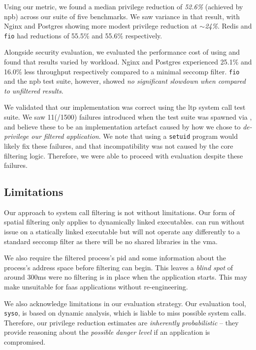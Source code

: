 Using our metric, we found a median privilege reduction of \textit{52.6\%}
(achieved by \ac{npb}) across our suite of five benchmarks. We saw variance in that
result, with Nginx and Postgres showing more modest privilege reduction at
$\sim$\textit{24\%}. Redis and \texttt{fio} had reductions of 55.5\% and 55.6\%
respectively.

Alongside security evaluation, we evaluated the performance cost of using \af
and found that results varied by workload. Nginx and Postgres experienced 25.1\% and 16.0\%
less throughput respectively compared to a minimal seccomp filter. \texttt{fio}
and the \ac{npb} test suite, however, showed \textit{no significant slowdown
when compared to unfiltered results}. 

We validated that our implementation was correct using the \ac{ltp} system call
test suite. We saw 11(/1500) failures introduced when the test suite was spawned via
\af, and believe these to be an implementation artefact caused by how we chose
to \textit{de-privilege our filtered application}. We note that using a
\texttt{setuid} program would likely fix these failures, and that
incompatibility was not caused by the core filtering logic. Therefore, we were
able to proceed with evaluation despite these failures.


\subsection{Limitations}

Our approach to system call filtering is not without limitations. Our form of 
spatial filtering only applies to dynamically linked executables.
\af can run without issue on a statically linked executable but will not operate
any differently to a standard seccomp filter as there will be no shared
libraries in the \ac{vma}.

We also require the filtered process's \ac{pid} and some information about the
process's address space before filtering can begin. This leaves a \textit{blind
spot} of around 300ms were no filtering is in place when the application starts.
This may make \af unsuitable for \ac{faas} applications without re-engineering.

We also acknowledge limitations in our evaluation strategy. Our evaluation tool,
\texttt{syso}, is based on dynamic analysis, which is liable to miss possible
system calls. Therefore, our privilege reduction estimates are
\textit{inherently probabilistic} -- they provide reasoning about the
\textit{possible danger level} if an application is compromised.

